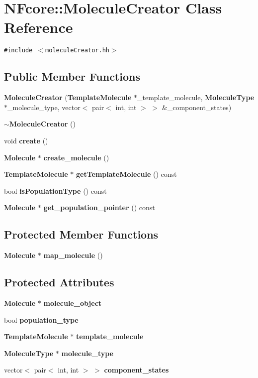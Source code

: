 \section{NFcore::MoleculeCreator Class Reference}
\label{classNFcore_1_1MoleculeCreator}
{\tt \#include $<$moleculeCreator.hh$>$}

\subsection*{Public Member Functions}
\begin{CompactItemize}
\item 
{\bf MoleculeCreator} ({\bf TemplateMolecule} $\ast$\_\-template\_\-molecule, {\bf MoleculeType} $\ast$\_\-molecule\_\-type, vector$<$ pair$<$ int, int $>$ $>$ \&\_\-component\_\-states)
\item 
{\bf $\sim$MoleculeCreator} ()
\item 
void {\bf create} ()
\item 
{\bf Molecule} $\ast$ {\bf create\_\-molecule} ()
\item 
{\bf TemplateMolecule} $\ast$ {\bf getTemplateMolecule} () const 
\item 
bool {\bf isPopulationType} () const 
\item 
{\bf Molecule} $\ast$ {\bf get\_\-population\_\-pointer} () const 
\end{CompactItemize}
\subsection*{Protected Member Functions}
\begin{CompactItemize}
\item 
{\bf Molecule} $\ast$ {\bf map\_\-molecule} ()
\end{CompactItemize}
\subsection*{Protected Attributes}
\begin{CompactItemize}
\item 
{\bf Molecule} $\ast$ {\bf molecule\_\-object}
\item 
bool {\bf population\_\-type}
\item 
{\bf TemplateMolecule} $\ast$ {\bf template\_\-molecule}
\item 
{\bf MoleculeType} $\ast$ {\bf molecule\_\-type}
\item 
vector$<$ pair$<$ int, int $>$ $>$ {\bf component\_\-states}
\end{CompactItemize}



